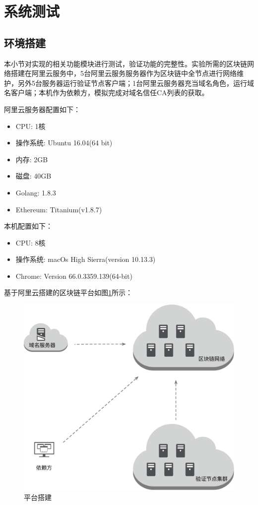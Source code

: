 
\section{系统测试}

\subsection{环境搭建}

本小节对实现的相关功能模块进行测试，验证功能的完整性。实验所需的区块链网络搭建在阿里云服务中，5台阿里云服务服务器作为区块链中全节点进行网络维护，另外5台服务器运行验证节点客户端；1台阿里云服务器充当域名角色，运行域名客户端；本机作为依赖方，模拟完成对域名信任CA列表的获取。

阿里云服务器配置如下：

\begin{itemize}
	\item CPU: 1核
	\item 操作系统: Ubuntu 16.04(64 bit)
	\item 内存: 2GB
	\item 磁盘: 40GB
	\item Golang: 1.8.3
	\item Ethereum: Titanium(v1.8.7)
\end{itemize}

本机配置如下：
\begin{itemize}
	\item CPU: 8核
	\item 操作系统: macOs High Sierra(version 10.13.3)
	\item Chrome: Version 66.0.3359.139(64-bit)
\end{itemize}

基于阿里云搭建的区块链平台如图\ref{fig:platform}所示：

\begin{figure}[htbp]
 	\centering
 	\includegraphics[scale = 0.4]{img/platform}
 	\caption{平台搭建}\label{fig:platform}
\end{figure}


